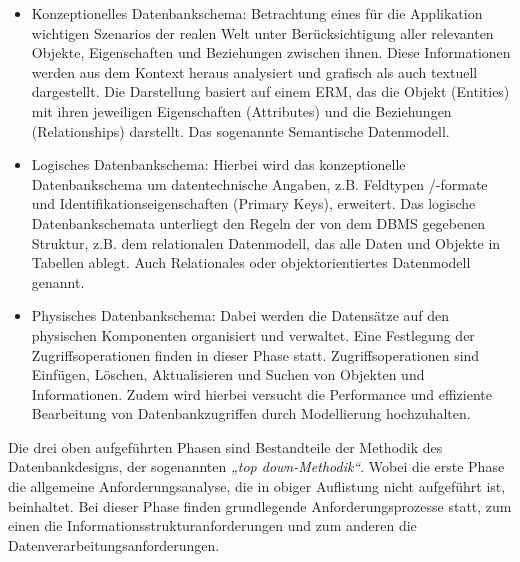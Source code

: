 \begin{itemize}
    \item Konzeptionelles Datenbankschema: Betrachtung eines für die Applikation wichtigen Szenarios der realen Welt unter Berücksichtigung 
    aller relevanten Objekte, Eigenschaften und Beziehungen zwischen ihnen. Diese Informationen werden aus dem Kontext heraus analysiert 
    und grafisch als auch textuell dargestellt. Die Darstellung basiert auf einem \ac{ERM}, das die Objekt (Entities) mit ihren jeweiligen 
    Eigenschaften (Attributes) und die Beziehungen (Relationships) darstellt. Das sogenannte Semantische Datenmodell.
    \item Logisches Datenbankschema: Hierbei wird das konzeptionelle Datenbankschema um datentechnische Angaben, z.B. Feldtypen /-formate 
    und Identifikationseigenschaften (Primary Keys), erweitert. Das logische Datenbankschemata unterliegt den Regeln der von dem \ac{DBMS}
    gegebenen Struktur, z.B. dem relationalen Datenmodell, das alle Daten und Objekte in Tabellen ablegt. Auch Relationales oder 
    objektorientiertes Datenmodell genannt. \cite{datenmodellierung.2019d}
    \item Physisches Datenbankschema: Dabei werden die Datensätze auf den physischen Komponenten organisiert und verwaltet. Eine Festlegung 
    der Zugriffsoperationen finden in dieser Phase statt. Zugriffsoperationen sind Einfügen, Löschen, Aktualisieren und Suchen von Objekten 
    und Informationen. Zudem wird hierbei versucht die Performance und effiziente Bearbeitung von Datenbankzugriffen durch Modellierung hochzuhalten.
\end{itemize}  
Die drei oben aufgeführten Phasen sind Bestandteile der Methodik des Datenbankdesigns, der sogenannten \textit{„top down-Methodik“}. 
Wobei die erste Phase die allgemeine Anforderungsanalyse, die in obiger Auflistung nicht aufgeführt ist, beinhaltet. Bei dieser Phase finden 
grundlegende Anforderungsprozesse statt, zum einen die Informationsstrukturanforderungen und zum anderen die Datenverarbeitungsanforderungen. 